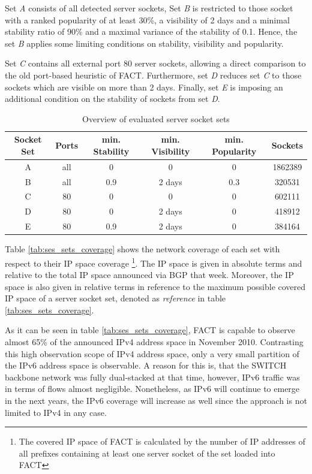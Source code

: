 Set \emph{A} consists of all detected \glspl{server socket}, Set \emph{B} is restricted to those socket with a ranked popularity of at least 30\%, a visibility of 2 days and a minimal stability ratio of 90\% and a maximal variance of the stability of 0.1. 
Hence, the set \emph{B} applies some limiting conditions on stability, visibility and popularity. 

Set \emph{C} contains all external port 80 \glspl{server socket}, allowing a direct comparison to the old port-based heuristic of \gls{FACT}. 
Furthermore, set \emph{D} reduces set \emph{C} to those sockets which are visible on more than 2 days. 
Finally, set \emph{E} is imposing an additional condition on the stability of sockets from set \emph{D}. 
\begin{table}
	[ht] \centering 
	\begin{tabular}
		{|c|c|c|c|c|c|} \hline \textbf{Socket Set} & \textbf{Ports} & \textbf{min. Stability} & \textbf{min. Visibility} & \textbf{min. Popularity} & \textbf{Sockets} \\
		\hline \hline A & all & 0 & 0 & 0 & 1862389 \\
		\hline B & all & 0.9\tablefootnote{additionally restricted to those sockets with a smaller variance of the stability than 0.1} & 2 days & 0.3 & 320531 \\
		\hline C & 80 & 0 & 0 & 0 & 602111 \\
		\hline D & 80 & 0 & 2 days & 0 & 418912 \\
		\hline E & 80 & 0.9 & 2 days & 0 & 384164\\
		\hline 
	\end{tabular}
	\caption{Overview of evaluated \gls{server socket} sets} 
	\label{tab:ses_sets} 
\end{table}

Table \ref{tab:ses_sets_coverage} shows the network coverage of each set with respect to their IP space coverage
\footnote{The covered IP space of FACT is calculated by the number of IP addresses of all prefixes containing at least one server socket of the set loaded into FACT}. 
The IP space is given in absolute terms and relative to the total IP space announced via BGP that week. Moreover, the IP space is also given in relative terms in reference to the maximum possible covered IP space of a server socket set, denoted as \emph{reference} in table  \ref{tab:ses_sets_coverage}.

As it can be seen in table \ref{tab:ses_sets_coverage}, \gls{FACT} is capable to observe almost 65\% of the announced IPv4 address space in November 2010. 
Contrasting this high observation scope of IPv4 address space, only a very small partition of the IPv6 address space is observable. 
A reason for this is, that the SWITCH backbone network was fully dual-stacked at that time, however, IPv6 traffic was in terms of flows almost negligible. Nonetheless, as IPv6 will continue to emerge in the next years, the IPv6 coverage will increase as well since the approach is not limited to IPv4 in any case. 


